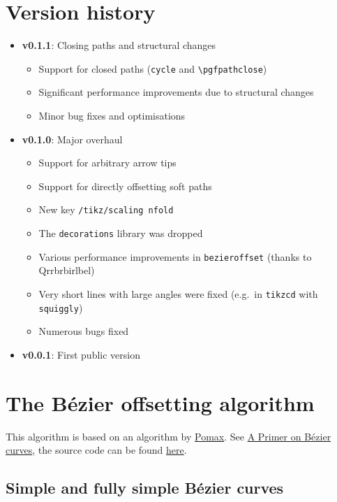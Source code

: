 \documentclass[12pt,a4paper]{article}
\theoremstyle{definition}
\begin{document}
\newpage
\section{Version history}

\begin{itemize}
  \item \textbf{v0.1.1}: Closing paths and structural changes
  \begin{itemize}
    \item Support for closed paths (\texttt{cycle} and \verb|\pgfpathclose|)
    \item Significant performance improvements due to structural changes
    \item Minor bug fixes and optimisations
\end{itemize}
  \item \textbf{v0.1.0}: Major overhaul
  \begin{itemize}
    \item Support for arbitrary arrow tips
    \item Support for directly offsetting soft paths
    \item New key \texttt{/tikz/scaling nfold}
    \item The \texttt{decorations} library was dropped
    \item Various performance improvements in \texttt{bezieroffset} (thanks to \hbox{Qrrbrbirlbel})
    \item Very short lines with large angles were fixed (e.g.\ in \texttt{tikzcd} with \texttt{squiggly})
    \item Numerous bugs fixed
  \end{itemize}
  \item \textbf{v0.0.1}: First public version
\end{itemize}

\appendix
\newpage
\section{The Bézier offsetting algorithm}

This algorithm is based on an algorithm by \href{https://github.com/Pomax/}{Pomax}. See \href{https://pomax.github.io/bezierinfo/#offsetting}{A Primer on Bézier curves}, the source code can be found \href{https://github.com/Pomax/bezierinfo/blob/bcfce2149fa5e5540a2a2605986adab3b2a9a3bf/js/graphics-element/lib/bezierjs/bezier.js}{here}.

\subsection{Simple and fully simple Bézier curves}
\end{document}

